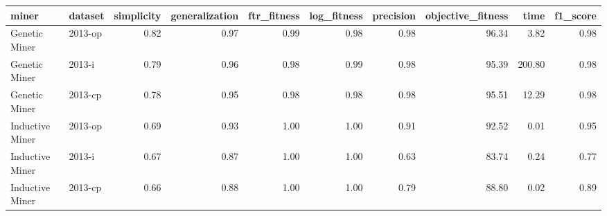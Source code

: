 \begin{tabular}{llrrrrrrrr}
\toprule
miner & dataset & simplicity & generalization & ftr_fitness & log_fitness & precision & objective_fitness & time & f1_score \\
\midrule
Genetic Miner & 2013-op & 0.82 & 0.97 & 0.99 & 0.98 & 0.98 & 96.34 & 3.82 & 0.98 \\
Genetic Miner & 2013-i & 0.79 & 0.96 & 0.98 & 0.99 & 0.98 & 95.39 & 200.80 & 0.98 \\
Genetic Miner & 2013-cp & 0.78 & 0.95 & 0.98 & 0.98 & 0.98 & 95.51 & 12.29 & 0.98 \\
Inductive Miner & 2013-op & 0.69 & 0.93 & 1.00 & 1.00 & 0.91 & 92.52 & 0.01 & 0.95 \\
Inductive Miner & 2013-i & 0.67 & 0.87 & 1.00 & 1.00 & 0.63 & 83.74 & 0.24 & 0.77 \\
Inductive Miner & 2013-cp & 0.66 & 0.88 & 1.00 & 1.00 & 0.79 & 88.80 & 0.02 & 0.89 \\
\bottomrule
\end{tabular}

